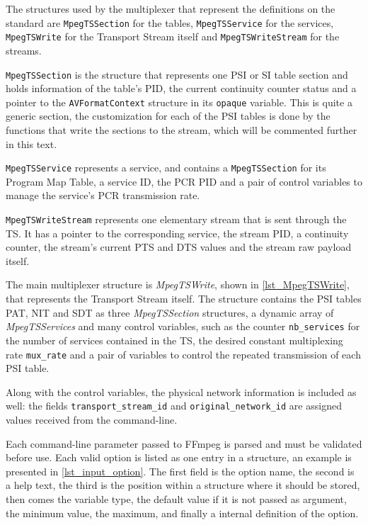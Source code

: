 \documentclass[
	12pt,				%
	openright,			%
	twoside,			%
	a4paper,			%
	brazil,
	french,				%
	english
	]{abntex2}
\begin{document}
The structures used by the multiplexer that represent the definitions on the standard are \texttt{MpegTSSection} for the tables, \texttt{MpegTSService} for the services, \texttt{MpegTSWrite} for the Transport Stream itself and \texttt{MpegTSWriteStream} for the streams.

\texttt{MpegTSSection} is the structure that represents one PSI or SI table section and holds information of the table's PID, the current continuity counter status and a pointer to the \texttt{AVFormatContext} structure in its \texttt{opaque} variable. This is quite a generic section, the customization for each of the PSI tables is done by the functions that write the sections to the stream, which will be commented further in this text.

\texttt{MpegTSService} represents a service, and contains a \texttt{MpegTSSection} for its Program Map Table, a service ID, the PCR PID and a pair of control variables to manage the service's PCR transmission rate.

\texttt{MpegTSWriteStream} represents one elementary stream that is sent through the TS. It has a pointer to the corresponding service, the stream PID, a continuity counter, the stream's current PTS and DTS values and the stream raw payload itself.

The main multiplexer structure is \textit{MpegTSWrite}, shown in \autoref{lst_MpegTSWrite}, that represents the Transport Stream itself. The structure contains the PSI tables PAT, NIT and SDT as three \textit{MpegTSSection} structures, a dynamic array of \textit{MpegTSServices} and many control variables, such as the counter \texttt{nb\_services} for the number of services contained in the TS, the desired constant multiplexing rate \texttt{mux\_rate} and a pair of variables to control the repeated transmission of each PSI table.

Along with the control variables, the physical network information is included as well: the fields \texttt{transport\_stream\_id} and \texttt{original\_network\_id} are assigned values received from the command-line.

Each command-line parameter passed to FFmpeg is parsed and must be validated before use. Each valid option is listed as one entry in a structure, an example is presented in \autoref{lst_input_option}. The first field is the option name, the second is a help text, the third is the position within a structure where it should be stored, then comes the variable type, the default value if it is not passed as argument, the minimum value, the maximum, and finally a internal definition of the option.
\end{document}
